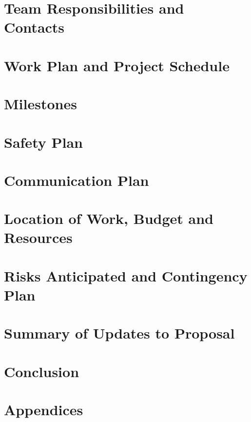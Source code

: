\documentclass[amsmath, amssymb, aps, pra, 12pt]{revtex4-1}
\begin{document}
\section{\label{sec:responsabilities}Team Responsibilities and Contacts}


\section{\label{sec:schedule}Work Plan and Project Schedule}


\section{\label{sec:milestones}Milestones}


\section{\label{sec:safety-plan}Safety Plan}


\section{\label{sec:communication-plan}Communication Plan}


\section{\label{sec:resources}Location of Work, Budget and Resources}


\section{\label{sec:contingency-plan}Risks Anticipated and Contingency Plan}


\section{\label{sec:update-summary}Summary of Updates to Proposal}


\section{\label{sec:conclusion}Conclusion}


\section{\label{sec:appendices}Appendices}



\end{document}
